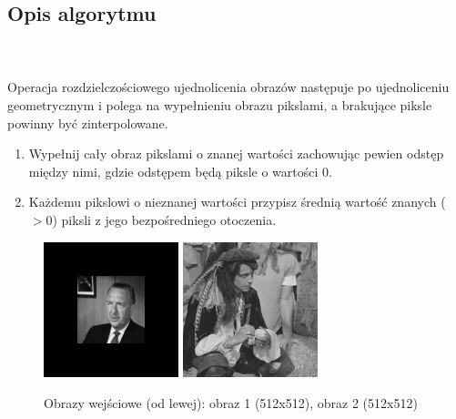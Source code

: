 \documentclass[final,a4paper,openany,12pt]{mwbk}
\begin{document}
\subsection*{Opis algorytmu}
\hfill
\\\\
\indent Operacja rozdzielczościowego ujednolicenia obrazów następuje po ujednoliceniu geometrycznym i polega na wypełnieniu obrazu pikslami, a brakujące piksle powinny być zinterpolowane.

\begin{enumerate}
	\item Wypełnij cały obraz pikslami o znanej wartości zachowując pewien odstęp między nimi, gdzie odstępem będą piksle o wartości 0.
	\item Każdemu pikslowi o nieznanej wartości przypisz średnią wartość znanych ($> 0$) piksli z jego bezpośredniego otoczenia.
\end{enumerate}

\begin{figure}[H]
	\begin{center}
		\includegraphics[width=0.35\textwidth]{gentelman_gray_unificationGeo_result}
		\includegraphics[width=0.35\textwidth]{pirate_gray_unificationGeo_result}
	\end{center}
	\caption{Obrazy wejściowe (od lewej): obraz 1 (512x512), obraz 2 (512x512)}
\end{figure}
\end{document}
